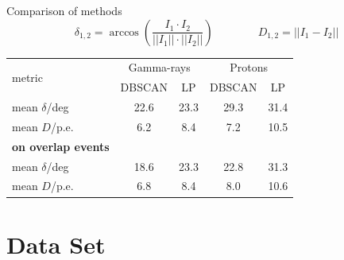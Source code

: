 \begin{frame}{Comparison of methods}
  \begin{equation*}
    \delta_{1,2} = \arccos\left(\frac{I_1\cdot I_2}{||I_1||\cdot||I_2||}\right)\qquad\qquad
    D_{1,2} = ||I_1 - I_2||
  \end{equation*}
  \begin{table}
    \centering%
    \begin{tabular}{l
                    c
                    c|
                    c
                    c}
      \toprule
      \multirow{2}{*}{metric} & \multicolumn{2}{c|}{Gamma-rays} & \multicolumn{2}{c}{Protons} \\
      \cline{2-5}
                    {}  & DBSCAN  & LP   & DBSCAN & LP \\
      \midrule
      mean $\delta$/deg & 22.6    & 23.3 & 29.3   & 31.4 \\
      mean $D$/p.e.     & 6.2     & 8.4  & 7.2    & 10.5 \\
      \midrule
      \textbf{on overlap events} & {}      & {}   & {}     & {} \\
      mean $\delta$/deg & 18.6    & 23.3 & 22.8   & 31.3 \\
      mean $D$/p.e.     & 6.8     & 8.4  & 8.0    & 10.6 \\
      \bottomrule
    \end{tabular}
  \end{table}
\end{frame}

\section{Data Set}

